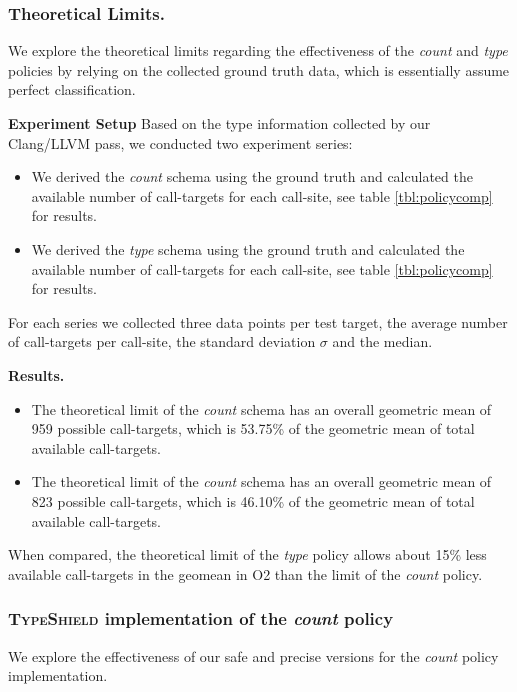 \subsubsection{Theoretical Limits.}
\label{subsection:theoreticallimit}
We explore the theoretical limits regarding the effectiveness of the \textit{count} and \textit{type} policies by relying on the collected ground truth data, which is essentially assume perfect classification.

\textbf{Experiment Setup} Based on the type information collected by our Clang/LLVM pass, we conducted two experiment series:
\begin{itemize}
\item We derived the \textit{count} schema using the ground truth and calculated the available number of call-targets for each call-site, see table \ref{tbl:policycomp} for results.
\item We derived the \textit{type} schema using the ground truth and calculated the available number of call-targets for each call-site, see table \ref{tbl:policycomp} for results.
\end{itemize}
For each series we collected three data points per test target, the average number of call-targets per call-site, the standard deviation $\sigma$ and the median.

\textbf{Results.}
\begin{itemize}
\item The theoretical limit of the \textit{count} schema has an overall geometric mean of 959 possible call-targets, which is 53.75\% of the geometric mean of total available 
call-targets.
\item The theoretical limit of the \textit{count} schema has an overall geometric mean of 823 possible call-targets, which is 46.10\% of the geometric mean of total available
call-targets.
\end{itemize}

When compared, the theoretical limit of the \textit{type} policy allows about 15\% less available call-targets in the geomean in O2 than the limit of the \textit{count} policy.

\subsubsection{\textsc{TypeShield} implementation of the \textit{count} policy}
\label{subsection:typeshieldvslimitcount}
We explore the effectiveness of our safe and precise versions for the \textit{count} policy implementation.

